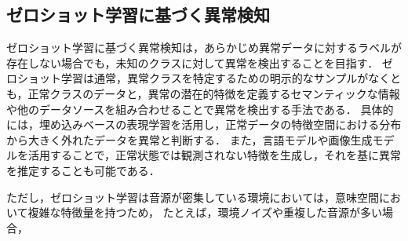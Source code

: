 \documentclass[../main]{subfiles}
\begin{document}
\subsection{ゼロショット学習に基づく異常検知}
ゼロショット学習に基づく異常検知は，あらかじめ異常データに対するラベルが存在しない場合でも，未知のクラスに対して異常を検出することを目指す．
ゼロショット学習は通常，異常クラスを特定するための明示的なサンプルがなくとも，正常クラスのデータと，異常の潜在的特徴を定義するセマンティックな情報や他のデータソースを組み合わせることで異常を検出する手法である．
具体的には，埋め込みベースの表現学習を活用し，正常データの特徴空間における分布から大きく外れたデータを異常と判断する．
また，言語モデルや画像生成モデルを活用することで，正常状態では観測されない特徴を生成し，それを基に異常を推定することも可能である．

ただし，ゼロショット学習は音源が密集している環境においては，意味空間において複雑な特徴量を持つため，
たとえば，環境ノイズや重複した音源が多い場合，
\end{document}
